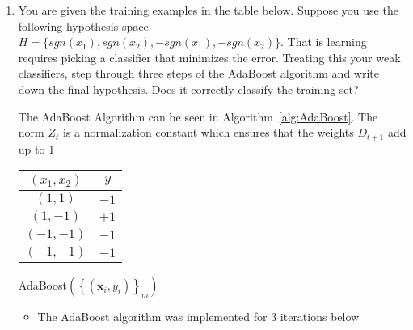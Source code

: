 \documentclass{article}
\begin{document}
\begin{enumerate}
\begin{itemize}
\end{itemize}


\item You are given the training examples in the table below. Suppose you use the following hypothesis space $H = \{ sgn(x_{1}), sgn(x_{2}),-sgn(x_{1}),-sgn(x_{2})\}$. That is learning requires picking a classifier that minimizes the error. Treating this your weak classifiers, step through three steps of the AdaBoost algorithm and write down the final hypothesis. Does it correctly classify the training set?

The AdaBoost Algorithm can be seen in Algorithm~\ref{alg:AdaBoost}. The norm $Z_{t}$ is a normalization constant which ensures that the weights $D_{t+1}$ add up to 1
\begin{center}
\begin{tabular}{|c | c|}
\hline
$(x_{1},x_{2})$ & $y$\\
\hline
$(1,1)$ & $-1$\\
$(1,-1)$ & $+1$\\
$(-1,-1)$ & $-1$\\
$(-1,-1)$ & $-1$\\
\hline
\end{tabular}
\end{center}
\begin{algorithm}
\begin{algorithmic}
  \STATE{\[\epsilon_{t}(h) = \frac{1}{2}-\frac{1}{2}\left(\sum_{i=1}^{m}D_{t}(i)y_{i}h(\mathbf{x}_{i})\right)\]}
  \STATE{\[Z_{t}=2\sqrt{\epsilon_{t}(1-\epsilon_{t})}\]}
  \STATE{\[D_{t+1}(i) = \frac{D_{t}(i)}{Z_{t}}\cdot\exp(-\alpha_{t}y_{i}h_{t}(\mathbf{x}_{i}))\]}
\ENDFOR
{}
\end{algorithmic}
\caption{AdaBoost$\left(\left\{(\mathbf{x}_{i},y_{i})\right\}_{m}\right)$}
\label{alg:AdaBoost}
\end{algorithm}
\begin{itemize}
\item The AdaBoost algorithm was implemented for 3 iterations below
\begin{align}

\end{align}
\end{itemize}
\end{enumerate}
\end{document}
